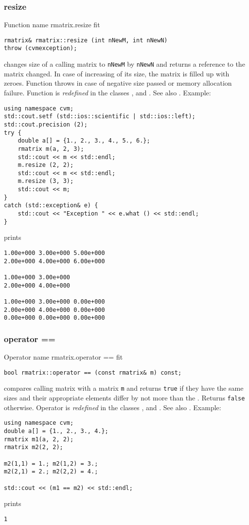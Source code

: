 \subsubsection{resize}
Function%
\pdfdest name {rmatrix.resize} fit
\begin{verbatim}
rmatrix& rmatrix::resize (int nNewM, int nNewN)
throw (cvmexception);
\end{verbatim}
changes  size of a calling matrix to \verb"nNewM" by \verb"nNewN"
and returns a reference to
the matrix changed. In case of increasing of its size, the matrix
is filled up with zeroes.
Function throws  
in case of negative size passed or memory allocation failure.
Function is \emph{redefined} in the classes
, 
and .
See also .
Example:
\begin{Verbatim}
using namespace cvm;
std::cout.setf (std::ios::scientific | std::ios::left);
std::cout.precision (2);
try {
    double a[] = {1., 2., 3., 4., 5., 6.};
    rmatrix m(a, 2, 3);
    std::cout << m << std::endl;
    m.resize (2, 2);
    std::cout << m << std::endl;
    m.resize (3, 3);
    std::cout << m;
}
catch (std::exception& e) {
    std::cout << "Exception " << e.what () << std::endl;
}
\end{Verbatim}
prints
\begin{Verbatim}
1.00e+000 3.00e+000 5.00e+000
2.00e+000 4.00e+000 6.00e+000

1.00e+000 3.00e+000
2.00e+000 4.00e+000

1.00e+000 3.00e+000 0.00e+000
2.00e+000 4.00e+000 0.00e+000
0.00e+000 0.00e+000 0.00e+000
\end{Verbatim}
\newpage




\subsubsection{operator ==}
Operator%
\pdfdest name {rmatrix.operator ==} fit
\begin{verbatim}
bool rmatrix::operator == (const rmatrix& m) const;
\end{verbatim}
compares  calling matrix with a matrix \verb"m"
and returns \verb"true" if they have the same sizes
and their appropriate elements differ by not more than the
.
Returns \verb"false" otherwise.
Operator is \emph{redefined} in the classes
, 
and .
See also .
Example:
\begin{Verbatim}
using namespace cvm;
double a[] = {1., 2., 3., 4.};
rmatrix m1(a, 2, 2);
rmatrix m2(2, 2);

m2(1,1) = 1.; m2(1,2) = 3.;
m2(2,1) = 2.; m2(2,2) = 4.;

std::cout << (m1 == m2) << std::endl;
\end{Verbatim}
prints
\begin{Verbatim}
1
\end{Verbatim}
\newpage




